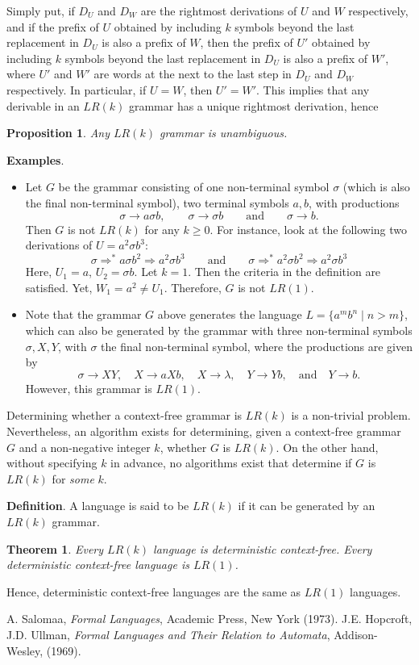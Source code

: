 \documentclass[12pt]{article}
\newtheorem{prop}{Proposition}
\newtheorem{thm}{Theorem}
\begin{document}
Simply put, if $D_U$ and $D_W$ are the rightmost derivations of $U$ and $W$ respectively, and if the prefix of $U$ obtained by including $k$ symbols beyond the last replacement in $D_U$ is also a prefix of $W$, then the prefix of $U'$ obtained by including $k$ symbols beyond the last replacement in $D_U$ is also a prefix of $W'$, where $U'$ and $W'$ are words at the next to the last step in $D_U$ and $D_W$ respectively.  In particular, if $U=W$, then $U'=W'$.  This implies that any derivable in an $LR(k)$ grammar has a unique rightmost derivation, hence
\begin{prop} Any $LR(k)$ grammar is unambiguous. \end{prop}

\textbf{Examples}.
\begin{itemize}
\item Let $G$ be the grammar consisting of one non-terminal symbol $\sigma$ (which is also the final non-terminal symbol), two terminal symbols $a,b$, with productions $$\sigma \to a\sigma b, \qquad \sigma\to \sigma b \qquad \mbox{and} \qquad \sigma \to b.$$  Then $G$ is not $LR(k)$ for any $k\ge 0$.
For instance, look at the following two derivations of $U=a^2\sigma b^3$:
$$\sigma \Rightarrow^* a \sigma b^2 \Rightarrow a^2 \sigma b^3\qquad \mbox{and}\qquad \sigma \Rightarrow^* a^2 \sigma b^2 \Rightarrow a^2 \sigma b^3$$
Here, $U_1=a$, $U_2=\sigma b$.  Let $k=1$.  Then the criteria in the definition are satisfied.  Yet, $W_1=a^2\ne U_1$.  Therefore, $G$ is not $LR(1)$.
\item Note that the grammar $G$ above generates the language $L=\lbrace a^m b^n \mid n > m\rbrace$, which can also be generated by the grammar with three non-terminal symbols $\sigma, X,Y$, with $\sigma$ the final non-terminal symbol, where the productions are given by $$\sigma \to XY,\quad X\to aXb, \quad X\to \lambda, \quad Y\to Yb, \quad \mbox{and} \quad Y\to b.$$  However, this grammar is $LR(1)$.
\end{itemize}

Determining whether a context-free grammar is $LR(k)$ is a non-trivial problem.  Nevertheless, an algorithm exists for determining, given a context-free grammar $G$ and a non-negative integer $k$, whether $G$ is $LR(k)$.  On the other hand, without specifying $k$ in advance, no algorithms exist that determine if $G$ is $LR(k)$ for \emph{some} $k$.

\textbf{Definition}.  A language is said to be $LR(k)$ if it can be generated by an $LR(k)$ grammar.

\begin{thm} Every $LR(k)$ language is deterministic context-free.  Every deterministic context-free language is $LR(1)$.  \end{thm}

Hence, deterministic context-free languages are the same as $LR(1)$ languages.

\begin{thebibliography}{9}
 A. Salomaa, {\em Formal Languages}, Academic Press, New York (1973).
 J.E. Hopcroft, J.D. Ullman, {\em Formal Languages and Their Relation to Automata}, Addison-Wesley, (1969).
\end{thebibliography}
\end{document}
